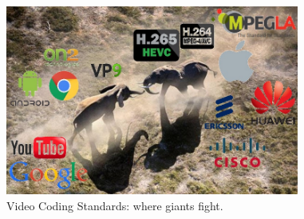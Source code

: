 \begin{figure}[htbp]
	\centering
	\includegraphics[width=0.86\textwidth]{fig/decisions/giants_fight.jpg} 
	\caption{Video Coding Standards: where giants fight.}\label{fig:giants-fight}
\end{figure}

